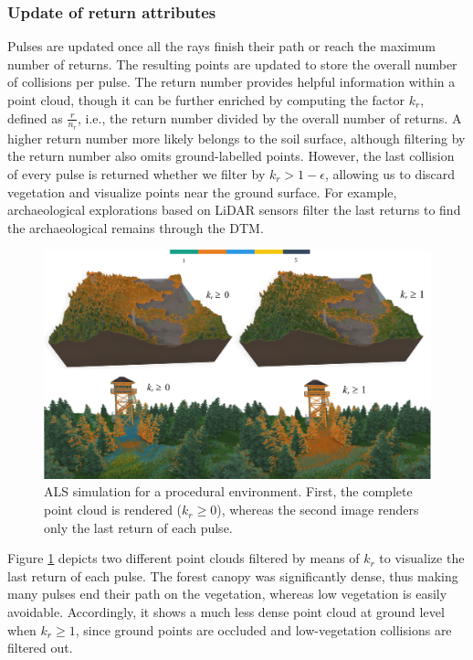 \subsubsection{Update of return attributes}

Pulses are updated once all the rays finish their path or reach the maximum number of returns. The resulting points are updated to store the overall number of collisions per pulse. The return number provides helpful information within a point cloud, though it can be further enriched by computing the factor $k_{r}$, defined as $\frac{r}{n_{r}}$, i.e., the return number divided by the overall number of returns. A higher return number more likely belongs to the soil surface, although filtering by the return number also omits ground-labelled points. However, the last collision of every pulse is returned whether we filter by $k_{r} > 1 - \epsilon$, allowing us to discard vegetation and visualize points near the ground surface. For example, archaeological explorations based on LiDAR sensors filter the last returns to find the archaeological remains through the DTM.

\begin{figure}[ht]
	\centering
	\includegraphics[width=1\linewidth]{figs/lidar_simulation/tls_multiple_returns.png}
	\caption{ALS simulation for a procedural environment. First, the complete point cloud is rendered ($k_{r} \geq 0$), whereas the second image renders only the last return of each pulse.}
	\label{fig:multiple_returns}
\end{figure}

Figure \ref{fig:multiple_returns} depicts two different point clouds filtered by means of $k_{r}$ to visualize the last return of each pulse. The forest canopy was significantly dense, thus making many pulses end their path on the vegetation, whereas low vegetation is easily avoidable. Accordingly, it shows a much less dense point cloud at ground level when $k_{r} \geq 1$, since ground points are occluded and low-vegetation collisions are filtered out. 

